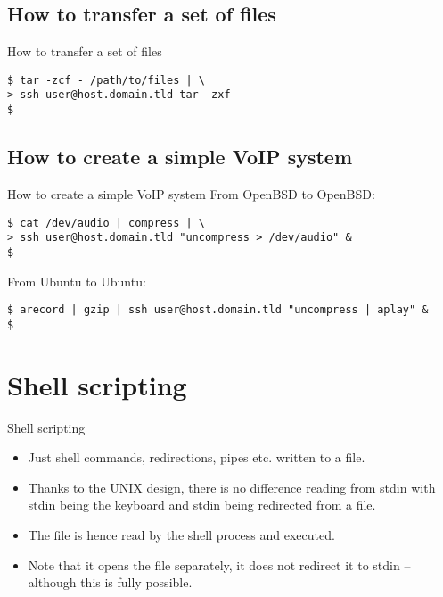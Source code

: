 \documentclass{beamer}
\begin{document}
\subsection{How to transfer a set of files}
\begin{frame}[fragile]{How to transfer a set of files}
	\begin{lstlisting}
$ tar -zcf - /path/to/files | \
> ssh user@host.domain.tld tar -zxf -
$
	\end{lstlisting}
\end{frame}

\subsection{How to create a simple VoIP system}
\begin{frame}[fragile]{How to create a simple VoIP system}
	From OpenBSD to OpenBSD:
	\begin{lstlisting}
$ cat /dev/audio | compress | \
> ssh user@host.domain.tld "uncompress > /dev/audio" &
$
	\end{lstlisting}

	\pause
	From Ubuntu to Ubuntu:
	\begin{lstlisting}
$ arecord | gzip | ssh user@host.domain.tld "uncompress | aplay" &
$
	\end{lstlisting}
\end{frame}


\section{Shell scripting}
\begin{frame}{Shell scripting}
	\begin{itemize}
		\item<1-> Just shell commands, redirections, pipes etc. written to a file.
		\item<2> Thanks to the UNIX design, there is no difference reading from 
			stdin with stdin being the keyboard and stdin being redirected from 
			a file.
		\item<3-4> The file is hence read by the shell process and executed.
		\item<4> Note that it opens the file separately, it does not redirect it to 
			stdin -- although this is fully possible.
	\end{itemize}
\end{frame}
\end{document}
